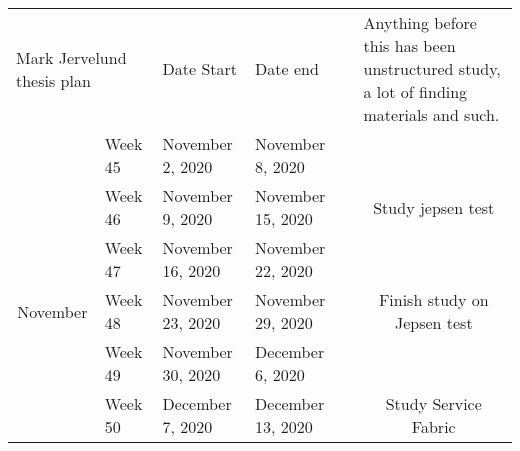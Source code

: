 \documentclass[
  a4paper,  %
  twoside,  %
  bibliography=totoc,
  headsepline,
  cleardoublepage=empty,
  parskip=half,
  draft=false
]{scrbook}
\begin{document}
\begin{table}[]
\begin{tabular}{clllcc}
\multicolumn{2}{l}{Mark Jervelund thesis plan} & Date Start        & Date end          & \multicolumn{1}{l}{}                                                                     & \multicolumn{1}{l}{Anything before this has been unstructured study, a lot of finding materials and such.}                 \\
                                & Week 45      & November 2, 2020  & November 8, 2020  &                                                                                          &                                                                                                                            \\
                                & Week 46      & November 9, 2020  & November 15, 2020 &                                                                                          & \multirow{-2}{*}{Study jepsen test}                                                                                        \\
                                & Week 47      & November 16, 2020 & November 22, 2020 &                                                                                          &                                                                                                                            \\
\multirow{-4}{*}{November}      & Week 48      & November 23, 2020 & November 29, 2020 &                                                                                          & \multirow{-2}{*}{Finish study on Jepsen test}                                                                              \\
                                & Week 49      & November 30, 2020 & December 6, 2020  &                                                                                          &                                                                                                                            \\
                                & Week 50      & December 7, 2020  & December 13, 2020 &                                                                                          & \multirow{-2}{*}{Study Service Fabric}                                                                                     \\

\end{tabular}
\end{table}
\end{document}
